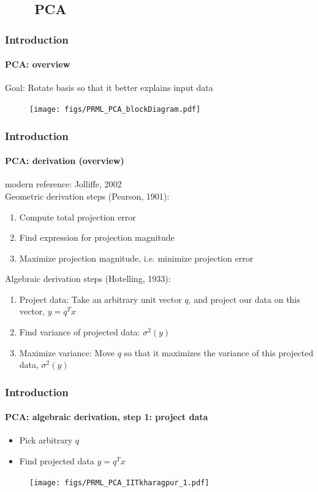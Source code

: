 \subsection{\ \ \ \ PCA}

\begin{frame}
\frametitle{Introduction}
\framesubtitle{PCA: overview}
\logoCSIPCPL\mypagenum
	{\color{red}Goal:} Rotate basis so that it better explains input data	\\
	\begin{figure}
		\texttt{[image: figs/PRML\_PCA\_blockDiagram.pdf]}
	\end{figure}
\end{frame}


\begin{frame}
\frametitle{Introduction}
\framesubtitle{PCA: derivation (overview)}
\logoCSIPCPL\mypagenum
	modern reference: Jolliffe, 2002\\
	\vspace{0.1in}
	{\color{red}Geometric derivation steps (Pearson, 1901):} 
	\begin{enumerate}
		\item {\color{blue} Compute total projection error}
		\item {\color{blue} Find expression for projection magnitude}
		\item {\color{blue} Maximize projection magnitude, i.e. minimize projection error}
	\end{enumerate}
	\vspace{0.1in}
	{\color{red}Algebraic derivation steps (Hotelling, 1933):} 
	\begin{enumerate}
		\item {\color{blue} Project data:} Take an arbitrary unit vector $q$, and project our data on this vector, $y = q^Tx$
		\item {\color{blue} Find variance of projected data:}  $\sigma^2(y)$
		\item {\color{blue} Maximize variance:} Move $q$ so that it maximizes the variance of this  projected data, $\sigma^2(y)$
	\end{enumerate}
\end{frame}


\begin{frame}
\frametitle{Introduction}
\framesubtitle{PCA: algebraic derivation, step 1: project data}
\logoCSIPCPL\mypagenum
	\begin{itemize}
		\item Pick arbitrary $q$ %
		\item Find projected data $y=q^Tx$
	\end{itemize}	
	\begin{figure}
		\texttt{[image: figs/PRML\_PCA\_IITkharagpur\_1.pdf]}
	\end{figure}
\end{frame}



